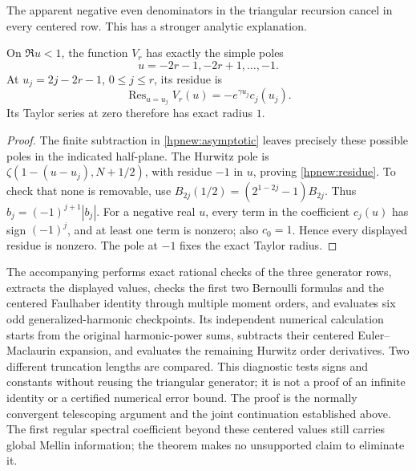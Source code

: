 The apparent negative even denominators in the triangular recursion
cancel in every centered row. This has a stronger analytic explanation.
\begin{corollary}
\label{hpnew:upoles}
On $\Re u<1$, the function $V_r$ has exactly the simple poles
\[
                     u=-2r-1,-2r+1,\ldots,-1.
\]
At $u_j=2j-2r-1$, $0\le j\le r$, its residue is
\begin{equation}\label{hpnew:residue}
             \operatorname{Res}_{u=u_j}V_r(u)
                        =-e^{\gamma u_j}c_j(u_j).
\end{equation}
Its Taylor series at zero therefore has exact radius $1$.
\end{corollary}

\begin{proof}
The finite subtraction in \eqref{hpnew:asymptotic} leaves precisely
these possible poles in the indicated half-plane. The Hurwitz pole is
$\zeta(1-(u-u_j),N+1/2)$, with residue $-1$ in $u$, proving
\eqref{hpnew:residue}. To check that none is removable, use
$B_{2j}(1/2)=(2^{1-2j}-1)B_{2j}$. Thus
$b_j=(-1)^{j+1}|b_j|$. For a negative real $u$, every term in the
coefficient $c_j(u)$ has sign $(-1)^j$, and at least one term is
nonzero; also $c_0=1$. Hence every displayed residue is nonzero.
The pole at $-1$ fixes the exact Taylor radius.
\end{proof}

The accompanying  performs exact
rational checks of the three generator rows, extracts the displayed
values, checks the first two Bernoulli formulas and the centered
Faulhaber identity through multiple moment orders, and evaluates six
odd generalized-harmonic checkpoints. Its independent numerical
calculation starts from the
original harmonic-power sums, subtracts their centered Euler--Maclaurin
expansion, and evaluates the remaining Hurwitz order derivatives.
Two different truncation lengths are compared. This diagnostic tests
signs and constants without reusing the triangular generator; it is
not a proof of an infinite identity or a certified numerical error bound.
The proof is the normally convergent telescoping argument and the
joint continuation established above. The first regular spectral
coefficient beyond these centered values still carries global Mellin
information; the theorem makes no unsupported claim to eliminate it.
